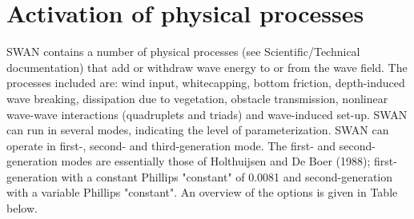 \documentclass[12pt]{book}
\begin{document}
\section{Activation of physical processes}
SWAN contains a number of physical processes (see Scientific/Technical documentation) that add or withdraw wave energy to or
from the wave field. The processes included are: wind input, whitecapping, bottom friction, depth-induced
wave breaking,
dissipation due to vegetation,
obstacle transmission, nonlinear wave-wave interactions (quadruplets and triads) and
wave-induced set-up. SWAN can run in several modes, indicating the level of parameterization. SWAN can operate
in first-, second- and third-generation mode. The first- and second-generation modes are essentially those
of Holthuijsen and De Boer (1988); first-generation with a constant Phillips "constant" of 0.0081 and
second-generation with a variable Phillips "constant". An overview of the options is given in Table below.
\end{document}
